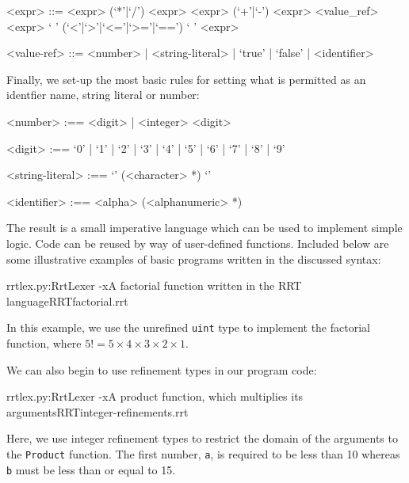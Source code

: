 \documentclass[a4paper,openany,12pt]{book}
\begin{document}
\begin{grammar}
<expr> ::= <expr> (`*'|`/') <expr>
    \alt <expr> (`+'|`-') <expr>
    \alt <value_ref>
    \alt <expr> ` ' (`<'|`>'|`<='|`>='|`==') ` ' <expr>

<value-ref> ::= <number> | <string-literal> | `true' | `false' | <identifier>
\end{grammar}

Finally, we set-up the most basic rules for setting what is permitted as an identfier name, string literal or
number:

\begin{grammar}
    <number> :== <digit> | <integer> <digit>

    <digit> :== `0' | `1' | `2' | `3' | `4' | `5' | `6' | `7' | `8' | `9'

    <string-literal> :== `\textquotedbl{}' (<character> *) `\textquotedbl{}'

    <identifier> :== <alpha> (<alphanumeric> *)
\end{grammar}

The result is a small imperative language which can be used to implement simple logic.
Code can be reused by way of user-defined functions.
Included below are some illustrative examples of basic programs written in the discussed syntax:

\begin{mycodefile}{rrtlex.py:RrtLexer -x}{\label{code:rrt:1}A factorial function written in the RRT language}{RRT}{factorial.rrt}
    \vspace{0.5em}

    In this example, we use the unrefined \texttt{uint} type to implement the factorial function, where
    $5! = 5\times 4 \times 3 \times 2 \times 1$.
\end{mycodefile}

We can also begin to use refinement types in our program code:

\begin{mycodefile}{rrtlex.py:RrtLexer -x}{\label{code:rrt:2}A product function, which multiplies its arguments}{RRT}{integer-refinements.rrt}
    \vspace{0.5em}

    Here, we use integer refinement types to restrict the domain of the arguments to the \texttt{Product}
    function.
    The first number, \texttt{a}, is required to be less than 10 whereas \texttt{b} must be less than or equal to 15.
\end{mycodefile}
\end{document}
